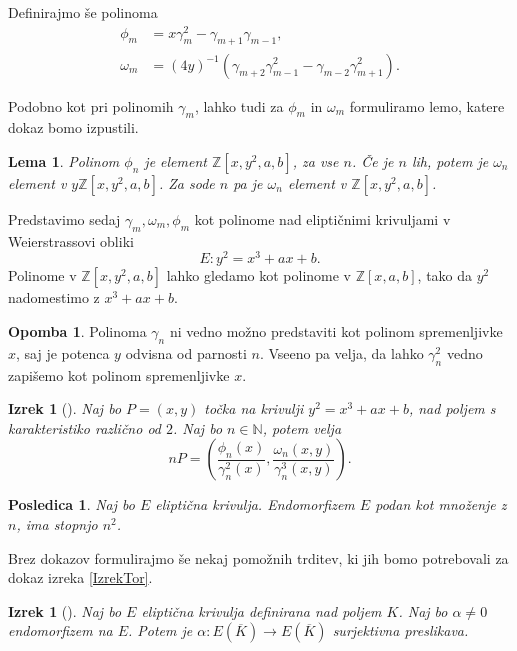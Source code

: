 \documentclass[12pt,a4paper,twoside]{article}
\theoremstyle{definition} %
\newtheorem{opomba}[definicija]{Opomba}
\theoremstyle{plain} %
\newtheorem{lema}[definicija]{Lema}
\newtheorem{izrek}[definicija]{Izrek}
\newtheorem{posledica}[definicija]{Posledica}
\numberwithin{equation}{section}  %
\newcommand{\N}{\mathbb N}
\newcommand{\Z}{\mathbb Z}
\newcommand{\E}[1]{E({#1})}
\begin{document}
Definirajmo še polinoma
\begin{align}
\phi_m &{}=x\gamma^2_m-\gamma_{m+1}\gamma_{m-1}, \nonumber \\
\omega_m &{} = (4y)^{-1}(\gamma_{m+2}\gamma^2_{m-1}-\gamma_{m-2}\gamma^2_{m+1}). \nonumber
\end{align}

Podobno kot pri polinomih $\gamma_m$, lahko tudi za $\phi_m$ in $\omega_m$ formuliramo lemo, katere dokaz bomo izpustili.

\begin{lema}
Polinom $\phi_{n}$ je element $\Z[x,y^2,a,b]$, za vse $n$. Če je $n$ lih, potem je $\omega_{n}$ element v \newline $y\Z[x,y^2,a,b]$. Za sode $n$ pa je $\omega_{n}$ element v $\Z[x,y^2,a,b]$.

\end{lema}

Predstavimo sedaj $\gamma_m, \omega_m, \phi_m$ kot polinome nad eliptičnimi krivuljami v Weierstrassovi obliki
$$E: y^2=x^3+ax+b.$$
Polinome v $\Z[x,y^2,a,b]$ lahko gledamo kot polinome v $\Z[x,a,b]$, tako da $y^2$ nadomestimo z $x^3+ax+b$.

\begin{opomba}
Polinoma $\gamma_n$ ni vedno možno predstaviti kot polinom spremenljivke $x$, saj je potenca $y$ odvisna od parnosti $n$. Vseeno pa velja, da lahko $\gamma^2_n$ vedno zapišemo kot polinom spremenljivke $x$.

\end{opomba}

\begin{izrek}[]

\label{izrek:3.6}
Naj bo $P = (x,y)$ točka na krivulji $y^2 = x^3+ax+b$, nad poljem s karakteristiko različno od $2$. Naj bo $n\in \N$, potem velja
$$nP = \left( \frac{\phi_n(x)}{\gamma^2_n(x)}, \frac{\omega_n(x,y)}{\gamma^3_n(x,y)}\right).$$


\end{izrek}

\begin{posledica}
\label{posledica:3.7}
Naj bo $E$ eliptična krivulja. Endomorfizem $E$ podan kot množenje z $n$, ima stopnjo $n^2$.
\end{posledica}

Brez dokazov formulirajmo še nekaj pomožnih trditev, ki jih bomo potrebovali za dokaz izreka \ref{IzrekTor}.

\begin{izrek}[]
\label{izrek:2.22}
Naj bo $E$ eliptična krivulja definirana nad poljem $K$. Naj bo $\alpha \neq 0$ endomorfizem na $E$. Potem je $\alpha: \E{\overline{K}} \rightarrow \E{\overline{K}}$ surjektivna preslikava.

\end{izrek}
\end{document}
